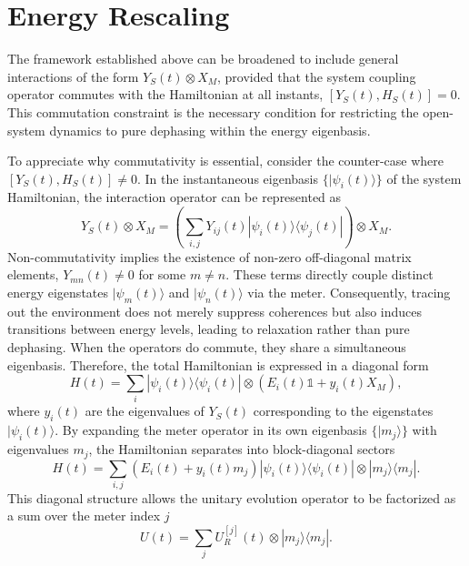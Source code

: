 \section{Energy Rescaling}

\qquad The framework established above can be broadened to include general interactions of the form $Y_S(t) \otimes X_M$, provided that the system coupling operator commutes with the Hamiltonian at all instants, $[Y_S(t), H_S(t)] = 0$. This commutation constraint is the necessary condition for restricting the open-system dynamics to pure dephasing within the energy eigenbasis.

\qquad To appreciate why commutativity is essential, consider the counter-case where $[Y_S(t), H_S(t)] \neq 0$. In the instantaneous eigenbasis $\{|\psi_i(t)\rangle\}$ of the system Hamiltonian, the interaction operator can be represented as
\begin{equation}
    Y_S(t) \otimes X_M = \left( \sum_{i,j} Y_{ij}(t) |\psi_i(t)\rangle\langle\psi_j(t)| \right) \otimes X_M.
\end{equation}
\qquad Non-commutativity implies the existence of non-zero off-diagonal matrix elements, $Y_{mn}(t) \neq 0$ for some $m \neq n$. These terms directly couple distinct energy eigenstates $|\psi_m(t)\rangle$ and $|\psi_n(t)\rangle$ via the meter. Consequently, tracing out the environment does not merely suppress coherences but also induces transitions between energy levels, leading to relaxation rather than pure dephasing. When the operators do commute, they share a simultaneous eigenbasis. Therefore, the total Hamiltonian is expressed in a diagonal form
\begin{equation}
    H(t) = \sum_i |\psi_i(t)\rangle\langle\psi_i(t)| \otimes (E_i(t)\mathds{1} + y_i(t)X_M),
\end{equation}
where $y_i(t)$ are the eigenvalues of $Y_S(t)$ corresponding to the eigenstates $|\psi_i(t)\rangle$. By expanding the meter operator in its own eigenbasis $\{|m_j\rangle\}$ with eigenvalues $m_j$, the Hamiltonian separates into block-diagonal sectors
\begin{equation}
    H(t) = \sum_{i,j} (E_i(t) + y_i(t)m_j) |\psi_i(t)\rangle\langle\psi_i(t)| \otimes |m_j\rangle\langle m_j|.
\end{equation}
This diagonal structure allows the unitary evolution operator to be factorized as a sum over the meter index $j$
\begin{equation}
    U(t) = \sum_j U_R^{[j]}(t) \otimes |m_j\rangle\langle m_j|.
\end{equation}
